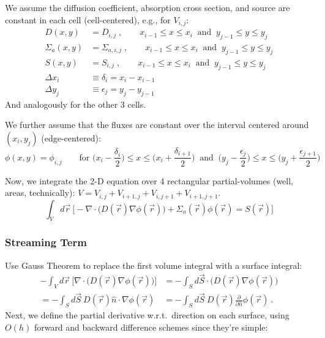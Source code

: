 \documentclass[12pt, answers]{exam}
\begin{document}
We assume the diffusion coefficient, absorption cross section, and source are constant in each cell (cell-centered), e.g., for $V_{i,j}$:
\begin{align}
D(x,y) &= D_{i,j}\;, \qquad x_{i-1} \leq x \leq x_i \:\text{ and }\: y_{j-1} \leq y \leq y_j \nonumber \\
%
\Sigma_a(x,y) &= \Sigma_{a,i,j}\;, \qquad x_{i-1} \leq x \leq x_i \:\text{ and }\: y_{j-1} \leq y \leq y_j \nonumber \\
%
S(x,y) &= S_{i,j}\;, \qquad x_{i-1} \leq x \leq x_i \:\text{ and }\: y_{j-1} \leq y \leq y_j \nonumber \\
%
\Delta x_i &\equiv \delta_i = x_{i} - x_{i-1} \nonumber \\
\Delta y_j &\equiv \epsilon_j = y_{j} - y_{j-1} \nonumber
\end{align}
And analogously for the other 3 cells.

We further assume that the fluxes are constant over the interval centered around $(x_i, y_j)$ (edge-centered):
%
\[\phi(x,y) = \phi_{i,j} \qquad \text{for } \bigl(x_i - \frac{\delta_i}{2}\bigr) \leq x \leq \bigl(x_i + \frac{\delta_{i+1}}{2}\bigr) \:\text{ and }\:\bigl(y_j - \frac{\epsilon_j}{2}\bigr) \leq x \leq \bigl(y_j + \frac{\epsilon_{j+1}}{2}\bigr) \]

Now, we integrate the 2-D equation over 4 rectangular partial-volumes (well, areas, technically): $V = V_{i,j} + V_{i+1,j} + V_{i,j+1} + V_{i+1,j+1}$.
%
\[\int_V d\vec{r}\:\bigl[-\nabla \cdot \bigl(D(\vec{r})\nabla \phi(\vec{r})\bigr) +\Sigma_a(\vec{r}) \phi(\vec{r}) = S(\vec{r}) \bigr]\]


\subsubsection*{Streaming Term}
Use Gauss Theorem to replace the first volume integral with a surface integral:
%
\begin{align}
-\int_V d\vec{r}\:\bigl[\nabla \cdot \bigl(D(\vec{r})\nabla \phi(\vec{r})\bigr)\bigr] &= -\int_S d\vec{S} \cdot\bigl(D(\vec{r})\nabla \phi(\vec{r})\bigr) \nonumber \\
%
= -\int_S d\vec{S}\: D(\vec{r})\hat{n} \cdot \nabla \phi(\vec{r}) &= -\int_S d\vec{S} \:D(\vec{r})\frac{\partial}{\partial \hat{n}}\phi(\vec{r})\:. \nonumber
\end{align}
%
Next, we define the partial derivative w.r.t.\ direction on each surface, using $O(h)$ forward and backward difference schemes since they're simple:
\end{document}
